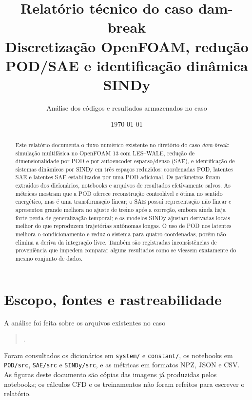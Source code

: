 \documentclass[12pt,a4paper]{article}
\title{\textbf{Relatório técnico do caso dam-break}\\[0.4em]
Discretização OpenFOAM, redução POD/SAE e identificação dinâmica SINDy}
\author{Análise dos códigos e resultados armazenados no caso}
\date{\today}
\newcommand{\code}[1]{\texttt{#1}}
\begin{document}
\maketitle

\begin{abstract}
Este relatório documenta o fluxo numérico existente no diretório do caso \emph{dam-break}: simulação multifásica no OpenFOAM 13 com LES--WALE, redução de dimensionalidade por POD e por autoencoder esparso/denso (SAE), e identificação de sistemas dinâmicos por SINDy em três espaços reduzidos: coordenadas POD, latentes SAE e latentes SAE estabilizados por uma POD adicional. Os parâmetros foram extraídos dos dicionários, notebooks e arquivos de resultados efetivamente salvos. As métricas mostram que a POD oferece reconstrução controlável e ótima no sentido energético, mas é uma transformação linear; o SAE possui representação não linear e apresentou grande melhora no ajuste de treino após a correção, embora ainda haja forte perda de generalização temporal; e os modelos SINDy ajustam derivadas locais melhor do que reproduzem trajetórias autônomas longas. O uso de POD nos latentes melhora o condicionamento e reduz o sistema para quatro coordenadas, porém não elimina a deriva da integração livre. Também são registradas inconsistências de proveniência que impedem comparar alguns resultados como se viessem exatamente do mesmo conjunto de dados.
\end{abstract}

\tableofcontents
\listoffigures
\listoftables
\clearpage

\section{Escopo, fontes e rastreabilidade}
A análise foi feita sobre os arquivos existentes no caso
\begin{quote}\small
{}.
\end{quote}
Foram consultados os dicionários em \code{system/} e \code{constant/}, os notebooks em \code{POD/src}, \code{SAE/src} e \code{SINDy/src}, e as métricas em formatos NPZ, JSON e CSV. As figuras deste documento são cópias das imagens já produzidas pelos notebooks; os cálculos CFD e os treinamentos não foram refeitos para escrever o relatório.
\end{document}
